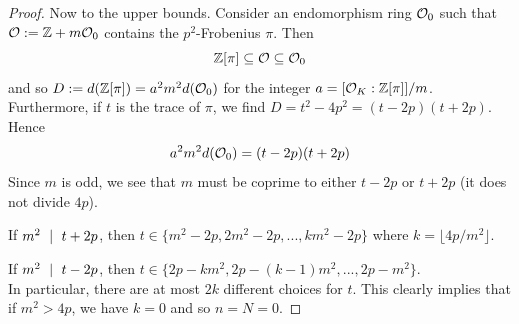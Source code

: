 \begin{proof}
    Now to the upper bounds.
    Consider an endomorphism ring $\mathcal{O}_0$ such that $\mathcal{O} := \mathbb{Z} + m\mathcal{O}_0$ contains the $p^2$-Frobenius $\pi$.
    Then
    \begin{equation*}
        \mathbb{Z}[\pi] \subseteq \mathcal{O} \subseteq \mathcal{O}_0
    \end{equation*}
    and so $D := d(\mathbb{Z}[\pi]) = a^2m^2d(\mathcal{O}_0)$ for the integer $a = [\mathcal{O}_K : \mathbb{Z}[\pi]] / m$.
    Furthermore, if $t$ is the trace of $\pi$, we find $D = t^2 - 4p^2 = (t - 2p)(t + 2p)$.
    Hence
    \begin{equation*}
        a^2m^2d(\mathcal{O}_0) = (t - 2p)(t + 2p)
    \end{equation*}
    Since $m$ is odd, we see that $m$ must be coprime to either $t - 2p$ or $t + 2p$ (it does not divide $4p$).

    If $m^2 \ \mid \  t + 2p$, then $t \in \{ m^2 - 2p, 2m^2 - 2p, ..., km^2 - 2p \}$ where $k = \lfloor 4p/m^2 \rfloor$.

    If $m^2 \ \mid \  t - 2p$, then $t \in \{ 2p - km^2, 2p - (k - 1)m^2, ..., 2p - m^2 \}$.
    \\
    In particular, there are at most $2k$ different choices for $t$.
    This clearly implies that if $m^2 > 4p$, we have $k = 0$ and so $n = N = 0$.


\end{proof}
